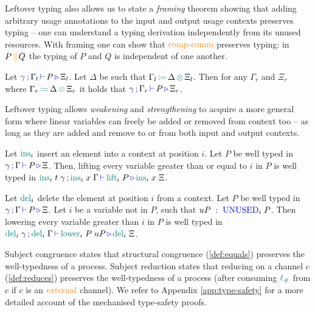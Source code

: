\documentclass[runningheads]{llncs}
\newcommand{\type}[1]{\textcolor{blue}{\operatorname{#1}}}
\newcommand{\constr}[1]{\textcolor{orange}{\operatorname{#1}}}
\newcommand{\func}[1]{\textcolor{teal}{\operatorname{#1}}}
\newcommand{\comp}[2]{#1 \, \constr{\parallel} \, #2}
\newcommand{\opctx}[3]{#1 \, \func{\coloneqq} \, #2 \, \func{\otimes} \, #3}
\newcommand{\lio}{\func{\ell_{\#}}}
\newcommand{\types}[4]{#1 \, \type{;} \, #2 \, \type{\vdash} \, #3 \, \type{\triangleright} \, #4}
\newcommand{\Unused}{\type{UNUSED}}
\begin{document}
Leftover typing also allows us to state a \emph{framing} theorem showing that adding arbitrary usage annotations to the input and output usage contexts preserves typing -- one can understand a typing derivation independently from its unused resources.
With framing one can show that $\constr{comp-comm}$ preserves typing: in $\comp{P}{Q}$ the typing of $P$ and $Q$ is independent of one another.
\begin{nitheorem}[Framing]
  \label{thm:framing}
  Let $\types{\gamma}{\Gamma_l}{P}{\Xi_l}$.
  Let $\Delta$ be such that $\opctx{\Gamma_l}{\Delta}{\Xi_l}$.
  Then for any $\Gamma_r$ and $\Xi_r$ where $\opctx{\Gamma_r}{\Delta}{\Xi_r}$ it holds that $\types{\gamma}{\Gamma_r}{P}{\Xi_r}$.
\end{nitheorem}

Leftover typing allows \emph{weakening} and \emph{strengthening} to acquire a more general form where linear variables can freely be added or removed from context too -- as long as they are added and remove to or from both input and output contexts.

\begin{nitheorem}[Weakening]
  \label{thm:weakening}
  Let $\func{ins}_i$ insert an element into a context at position $i$.
  Let $P$ be well typed in $\types{\gamma}{\Gamma}{P}{\Xi}$.
  Then, lifting every variable greater than or equal to $i$ in $P$ is well typed in
  $\types{\func{ins}_i \; t \; \gamma}{\func{ins}_i \; x \; \Gamma}{\func{lift}_i \; P}{\func{ins}_i \; x \; \Xi}$.
\end{nitheorem}

\begin{nitheorem}[Strengthening]
  \label{thm:strengthening} 
  Let $\func{del}_i$ delete the element at position $i$ from a context.
  Let $P$ be well typed in $\types{\gamma}{\Gamma}{P}{\Xi}$.
  Let $i$ be a variable not in $P$, such that $uP \; : \; \Unused_i \; P$.
  Then lowering every variable greater than $i$ in $P$ is well typed in $\types{\func{del}_i \; \gamma}{\func{del}_i \; \Gamma}{\func{lower}_i \; P \; uP}{\func{del}_i \; \Xi}$.
\end{nitheorem}

Subject congruence states that structural congruence (\autoref{def:equals}) preserves the well-typedness of a process.
Subject reduction states that reducing on a channel $c$ (\autoref{def:reduces}) preserves the well-typedness of a process (after consuming $\lio$ from $c$ if $c$ is an $\constr{external}$ channel).
We refer to Appendix \ref{app:type-safety} for a more detailed account of the mechanised type-safety proofs.
\end{document}
